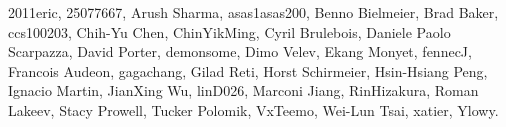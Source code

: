 2011eric,                      %
25077667,                      %
Arush Sharma,                  %
asas1asas200,                  %
Benno Bielmeier,               %
Brad Baker,                    %
ccs100203,                     %
Chih-Yu Chen,                  %
ChinYikMing,                   %
Cyril Brulebois,               %
Daniele Paolo Scarpazza,       %
David Porter,                  %
demonsome,                     %
Dimo Velev,                    %
Ekang Monyet,                  %
fennecJ,                       %
Francois Audeon,               %
gagachang,                     %
Gilad Reti,                    %
Horst Schirmeier,              %
Hsin-Hsiang Peng,              %
Ignacio Martin,                %
JianXing Wu,                   %
linD026,                       %
Marconi Jiang,                 %
RinHizakura,                   %
Roman Lakeev,                  %
Stacy Prowell,                 %
Tucker Polomik,                %
VxTeemo,                       %
Wei-Lun Tsai,                  %
xatier,                        %
Ylowy.                         %

